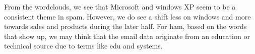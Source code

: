From the wordclouds, we see that Microsoft and windows XP seem to be a consistent theme in spam. However, we do see a shift less on windows and more towards sales and products during the later half. For ham, based on the words that show up, we may think that the email data originate from an education or technical source due to terms like edu and systems. \\